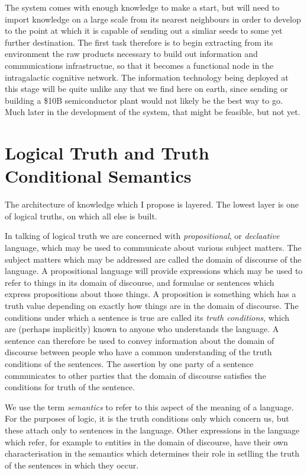 \documentclass[10pt,titlepage]{article}
\begin{document}
The system comes with enough knowledge to make a start, but will need to import knowledge on a large scale from its nearest neighbours in order to develop to the point at which it is capable of sending out a simliar seeds to some yet further destination.
The first task therefore is to begin extracting from its environment the raw products necessary to build out information and communications infrastructue, so that it becomes a functional node in the intragalactic cognitive network.
The information technology being deployed at this stage will be quite unlike any that we find here on earth, since sending or building a \$10B semiconductor plant would not likely be the best way to go.
Much later in the development of the system, that might be feasible, but not yet.

\section{Logical Truth and Truth Conditional Semantics}

The architecture of knowledge which I propose is layered.
The lowest layer is one of logical truths, on which all else is built.

In talking of logical truth we are concerned with \emph{propositional}, or \emph{declaative} language, which may be used to communicate about various subject matters.
The subject matters which may be addressed are called the domain of discourse of the language.
A propositional language will provide expressions which may be used to refer to things in its domain of discourse, and formulae or sentences which express propositions about those things.
A proposition is something which has a truth value depending on exactly how things are in the domain of discourse.
The conditions under which a sentence is true are called its \emph{truth conditions}, which are (perhaps implicitly) known to anyone who understands the language.
A sentence can therefore be used to convey information about the domain of discourse between people who have a common understanding of the truth conditions of the sentences.
The assertion by one party of a sentence communicates to other parties that the domain of discourse satisfies the conditions for truth of the sentence.

We use the term \emph{semantics} to refer to this aspect of the meaning of a language.
For the purposes of logic, it is the truth conditions only which concern us, but these attach only to sentences in the language.
Other expressions in the language which refer, for example to entities in the domain of discourse, have their own characterisation in the semantics which determines their role in setlling the truth of the sentences in which they occur.
\end{document}
